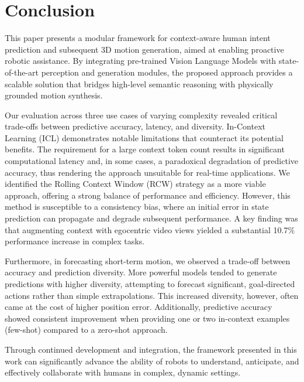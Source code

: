 \documentclass[biomimetics,article,submit,pdftex,moreauthors]{Definitions/mdpi}
\begin{document}
\section{Conclusion}
This paper presents a modular framework for context-aware human intent prediction and subsequent 3D motion generation, aimed at enabling proactive robotic assistance. By integrating pre-trained Vision Language Models with state-of-the-art perception and generation modules, the proposed approach provides a scalable solution that bridges high-level semantic reasoning with physically grounded motion synthesis. 

Our evaluation across three use cases of varying complexity revealed critical trade-offs between predictive accuracy, latency, and diversity. In-Context Learning (ICL) demonstrates notable limitations that counteract its potential benefits. The requirement for a large context token count results in significant computational latency and, in some cases, a paradoxical degradation of predictive accuracy, thus rendering the approach unsuitable for real-time applications. We identified the Rolling Context Window (RCW) strategy as a more viable approach, offering a strong balance of performance and efficiency. However, this method is susceptible to a consistency bias, where an initial error in state prediction can propagate and degrade subsequent performance. A key finding was that augmenting context with egocentric video views yielded a substantial 10.7\% performance increase in complex tasks.

Furthermore, in forecasting short-term motion, we observed a trade-off between accuracy and prediction diversity. More powerful models tended to generate predictions with higher diversity, attempting to forecast significant, goal-directed actions rather than simple extrapolations. This increased diversity, however, often came at the cost of higher position error. Additionally, predictive accuracy showed consistent improvement when providing one or two in-context examples (few-shot) compared to a zero-shot approach.


Through continued development and integration, the framework presented in this work can significantly advance the ability of robots to understand, anticipate, and effectively collaborate with humans in complex, dynamic settings.


\vspace{6pt} 

\end{document}
